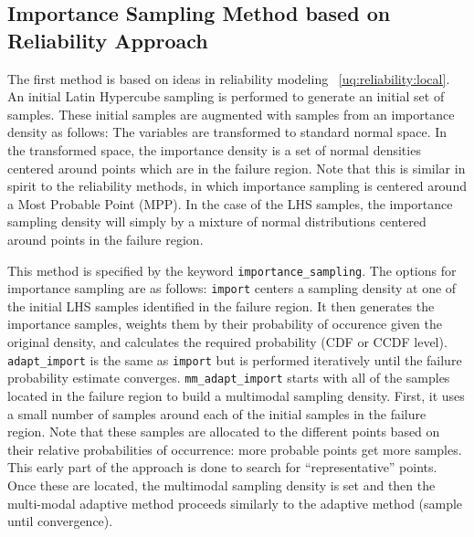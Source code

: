 \subsection{Importance Sampling Method based on Reliability Approach}\label{uq:importance_rel}
The first method is based on ideas in reliability modeling ~\ref{uq:reliability:local}.
An initial Latin Hypercube sampling is performed to generate an initial set of samples.
These initial samples are augmented with samples from an importance density as follows:
The variables are transformed to standard normal space. In the transformed space,
the importance density is a set of normal densities centered around points which
are in the failure region.  Note that this is similar in spirit to the reliability
methods, in which importance sampling is centered around a Most Probable Point (MPP).
In the case of the LHS samples, the importance sampling density will simply by
a mixture of normal distributions centered around points in the failure region.

This method is specified by the keyword \texttt{importance\_sampling}.
The options for importance sampling are as follows:  \texttt{import} 
centers a sampling
density at one of the initial LHS samples identified in the failure region.
It then generates the importance samples, weights them by their probability of occurence
given the original density, and calculates the required probability (CDF or CCDF level).
\texttt{adapt\_import} is the same as \texttt{import} but is performed iteratively until the
failure probability estimate converges.
\texttt{mm\_adapt\_import} starts with all of the samples located in the failure region
to build a multimodal sampling density. First, it uses a small number of samples around
each of the initial samples in the failure region.  Note that these samples
are allocated to the different points based on their relative probabilities of occurrence:
more probable points get more samples. This early part of the approach is done to 
search for ``representative'' points. Once these are located, the multimodal sampling density is set and then the multi-modal adaptive method proceeds similarly to the 
adaptive method (sample until convergence).
 
